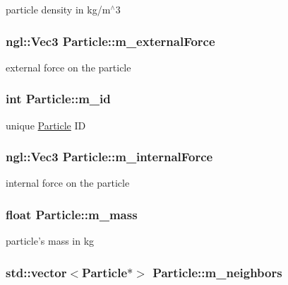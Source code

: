 particle density in kg/m$^\wedge$3 \hypertarget{classParticle_aa30f0a6fac4bee02f1082a2ebb04e7a5}{
\subsubsection[{m\_\-externalForce}]{\setlength{\rightskip}{0pt plus 5cm}ngl::Vec3 {\bf Particle::m\_\-externalForce}}}
\label{classParticle_aa30f0a6fac4bee02f1082a2ebb04e7a5}


external force on the particle \hypertarget{classParticle_a24c5edf015f4c3d067acf1a054f31f93}{
\subsubsection[{m\_\-id}]{\setlength{\rightskip}{0pt plus 5cm}int {\bf Particle::m\_\-id}}}
\label{classParticle_a24c5edf015f4c3d067acf1a054f31f93}


unique \hyperlink{classParticle}{Particle} ID \hypertarget{classParticle_ac4da3c37729ac9ed06664618d2a32f25}{
\subsubsection[{m\_\-internalForce}]{\setlength{\rightskip}{0pt plus 5cm}ngl::Vec3 {\bf Particle::m\_\-internalForce}}}
\label{classParticle_ac4da3c37729ac9ed06664618d2a32f25}


internal force on the particle \hypertarget{classParticle_ab78b76aeb4d163132a0c27ea4c5beb75}{
\subsubsection[{m\_\-mass}]{\setlength{\rightskip}{0pt plus 5cm}float {\bf Particle::m\_\-mass}}}
\label{classParticle_ab78b76aeb4d163132a0c27ea4c5beb75}


particle's mass in kg \hypertarget{classParticle_a250b194672f141d8439af838422f4efb}{
\subsubsection[{m\_\-neighbors}]{\setlength{\rightskip}{0pt plus 5cm}std::vector$<${\bf Particle}$\ast$$>$ {\bf Particle::m\_\-neighbors}}}
\label{classParticle_a250b194672f141d8439af838422f4efb}


